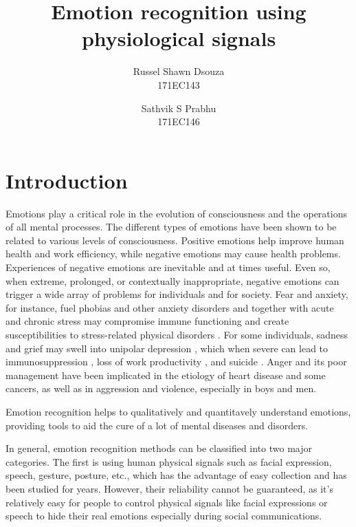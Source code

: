\documentclass[11pt]{article}
\title{\textbf{Emotion recognition using physiological signals}}
\author{
  Russel Shawn Dsouza\\
  171EC143
  \and
  Sathvik S Prabhu\\
  171EC146
}
\date{}
\theoremstyle{definition}
\begin{document}
  \maketitle

  \section{Introduction}
    Emotions play a critical role in the evolution of consciousness and the operations of all mental processes. The different types of emotions have been shown to be related to various levels of consciousness\cite{izard_emotion_2009}.
    Positive emotions help improve human health and work efficiency, while negative emotions may cause health problems.
    Experiences of negative emotions are inevitable and at times useful.
    Even so, when extreme, prolonged, or contextually inappropriate, negative emotions can trigger a wide array of problems for individuals and for society.
    Fear and anxiety, for instance, fuel phobias and other anxiety disorders \cite{ohman_automatic_1993} and together with acute and chronic stress may compromise immune functioning and create susceptibilities to stress-related physical disorders \cite{oleary_stress_1990}.
    For some individuals, sadness and grief may swell into unipolar depression \cite{nolen-hoeksema_response_1993}, which when severe can lead to immunosuppression \cite{oleary_stress_1990}, loss of work productivity \cite{coryell_enduring_1993}, and suicide \cite{chen_lifetime_1996}.
    Anger and its poor management have been implicated in the etiology of heart disease\cite{barefoot_hostility_1983, fredrickson_hostility_2000, scheier_person_1995} and some cancers\cite{eysenck_cancer_1994, greer_psychological_1975}, as well as in aggression and violence, especially in boys and men\cite{buss_evolution_2016, lemerise_development_2008}.

    Emotion recognition helps to qualitatively and quantitavely understand emotions, providing tools to aid the cure of a lot of mental diseases and disorders.

    In general, emotion recognition methods can be classified into two major categories.
    The first is using human physical signals such as facial expression, speech, gesture, posture, etc., which has the advantage of easy collection and has been studied for years.
    However, their reliability cannot be guaranteed, as it’s relatively easy for people to control physical signals like facial expressions or speech to hide their real emotions especially during social communications.
\end{document}
